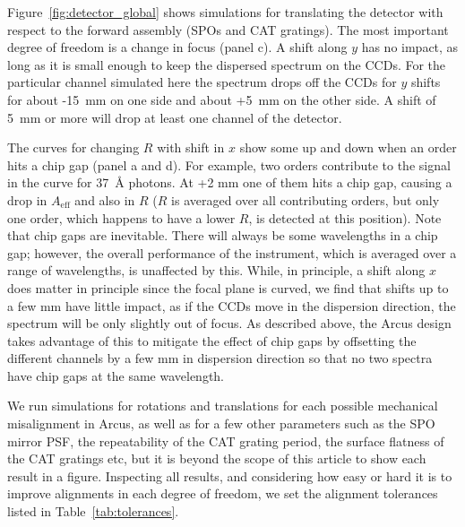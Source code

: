 \documentclass[12pt]{spieman}  %
\begin{document}
\begin{spacing}{1}
Figure~\ref{fig:detector_global} shows simulations for translating the detector with respect to the forward assembly (SPOs and CAT gratings). The most important degree of freedom is a change in focus (panel c). A shift along $y$ has no impact, as long as it is small enough to keep the dispersed spectrum on the CCDs. For the particular channel simulated here the spectrum drops off the CCDs for $y$ shifts for about -15~mm on one side and about +5~mm on the other side. A shift of 5~mm or more will drop at least one channel of the detector.

The curves for changing $R$ with shift in $x$ show some up and down when an order hits a chip gap (panel a and d). For example, two orders contribute to the signal in the curve for 37~\AA{} photons. At +2 mm one of them hits a chip gap, causing a drop in $A_\mathrm{eff}$ and also in $R$ ($R$ is averaged over all contributing orders, but only one order, which happens to have a lower $R$, is detected at this position). Note that chip gaps are inevitable. There will always be some wavelengths in a chip gap; however, the overall performance of the instrument, which is averaged over a range of wavelengths, is unaffected by this. While, in principle, a shift along $x$ does matter in principle since the focal plane is curved, we find that shifts up to a few mm have little impact, as if the CCDs move in the dispersion direction, the spectrum will be only slightly out of focus. As described above, the Arcus design takes advantage of this to mitigate the effect of chip gaps by offsetting the different channels by a few mm in dispersion direction so that no two spectra have chip gaps at the same wavelength.

We run simulations for rotations and translations for each possible mechanical misalignment in Arcus, as well as for a few other parameters such as the SPO mirror PSF, the repeatability of the CAT grating period, the surface flatness of the CAT gratings etc, but it is beyond the scope of this article to show each result in a figure. Inspecting all results, and considering how easy or hard it is to improve alignments in each degree of freedom, we set the alignment tolerances listed in Table~\ref{tab:tolerances}.


\end{spacing}
\end{document}
